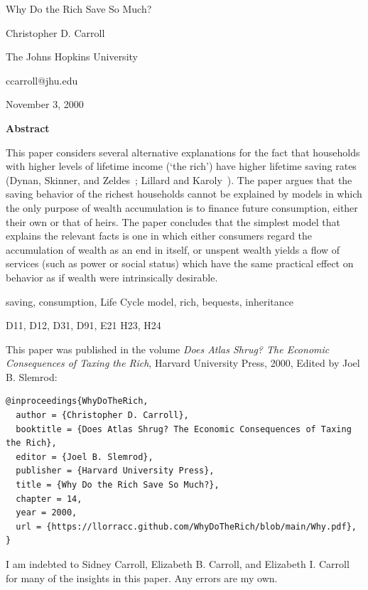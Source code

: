\documentclass[titlepage,12pt]{article}
\begin{document}
      

\begin{titlepage}

{\centerline {\LARGE Why Do the Rich Save So Much?}}
\vspace{0.5in}


\centerline{Christopher D. Carroll}
\centerline{The Johns Hopkins University}
\centerline{ccarroll@jhu.edu}

\medskip\medskip


\centerline{November 3, 2000}


\vspace{0.1in}

\centerline{\bf Abstract}

This paper considers several alternative explanations for the fact 
that households with higher levels of lifetime income (`the rich') 
have higher lifetime saving rates (Dynan, Skinner, and 
Zeldes~\citeyear{dsz:richsave}; Lillard and 
Karoly~\citeyear{lillard&karoly:richsave}).  The paper argues that the 
saving behavior of the richest households cannot be explained by 
models in which the only purpose of wealth accumulation is to finance 
future consumption, either their own or that of heirs.  The paper 
concludes that the simplest model that explains the relevant facts is 
one in which either consumers regard the accumulation of wealth as an 
end in itself, or unspent wealth yields a flow of services (such as 
power or social status) which have the same practical effect on 
behavior as if wealth were intrinsically desirable.

\vspace{.2in}
 saving, consumption, Life Cycle model, rich, 
bequests, inheritance

\medskip
{} D11, D12, D31, D91, E21 H23, H24 

\medskip \medskip This paper was published in the volume {\it Does Atlas Shrug?
The Economic Consequences of Taxing the Rich}, Harvard University Press, 
2000, Edited by Joel B. Slemrod:

\begin{tiny}
\begin{verbatim}
@inproceedings{WhyDoTheRich,
  author = {Christopher D. Carroll},
  booktitle = {Does Atlas Shrug? The Economic Consequences of Taxing the Rich},
  editor = {Joel B. Slemrod},
  publisher = {Harvard University Press},
  title = {Why Do the Rich Save So Much?},
  chapter = 14,
  year = 2000,
  url = {https://llorracc.github.com/WhyDoTheRich/blob/main/Why.pdf},
}
\end{verbatim}
\end{tiny}

{\small I am indebted to Sidney Carroll, Elizabeth B. 
Carroll, and Elizabeth I. Carroll for many of the insights in this 
paper.  Any errors are my own.}

\end{titlepage}
\end{document}
